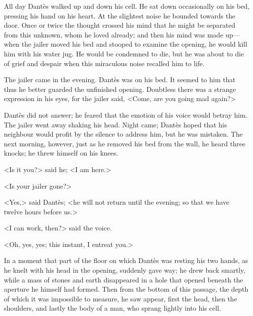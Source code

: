  All day Dantès walked up and down his cell. He sat down occasionally on his bed, pressing his hand on his heart. At the slightest noise he bounded towards the door. Once or twice the thought crossed his mind that he might be separated from this unknown, whom he loved already; and then his mind was made up—when the jailer moved his bed and stooped to examine the opening, he would kill him with his water jug. He would be condemned to die, but he was about to die of grief and despair when this miraculous noise recalled him to life. 

 The jailer came in the evening. Dantès was on his bed. It seemed to him that thus he better guarded the unfinished opening. Doubtless there was a strange expression in his eyes, for the jailer said, <Come, are you going mad again?> 

 Dantès did not answer; he feared that the emotion of his voice would betray him. The jailer went away shaking his head. Night came; Dantès hoped that his neighbour would profit by the silence to address him, but he was mistaken. The next morning, however, just as he removed his bed from the wall, he heard three knocks; he threw himself on his knees. 

 <Is it you?> said he; <I am here.> 

 <Is your jailer gone?> 

 <Yes,> said Dantès; <he will not return until the evening; so that we have twelve hours before us.> 

 <I can work, then?> said the voice. 

 <Oh, yes, yes; this instant, I entreat you.> 

 In a moment that part of the floor on which Dantès was resting his two hands, as he knelt with his head in the opening, suddenly gave way; he drew back smartly, while a mass of stones and earth disappeared in a hole that opened beneath the aperture he himself had formed. Then from the bottom of this passage, the depth of which it was impossible to measure, he saw appear, first the head, then the shoulders, and lastly the body of a man, who sprang lightly into his cell. 